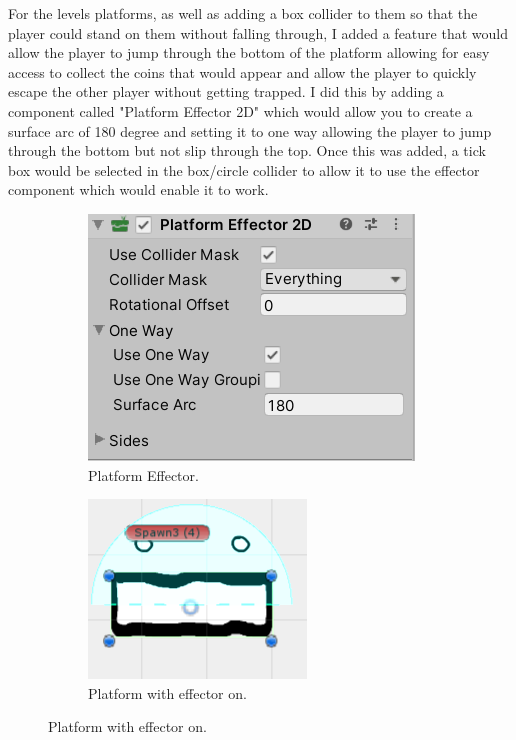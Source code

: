 \newpage

For the levels platforms, as well as adding a box collider to them so that the player could stand on them without falling through, I added a feature that would allow the player to jump through the bottom of the platform allowing for easy access to collect the coins that would appear and allow the player to quickly escape the other player without getting trapped. I did this by adding a component called "Platform Effector 2D" which would allow you to create a surface arc of 180 degree and setting it to one way allowing the player to jump through the bottom but not slip through the top. Once this was added, a tick box would be selected in the box/circle collider to allow it to use the effector component which would enable it to work.

\begin{figure}[h]
\centering
  \begin{subfigure}{.5\textwidth}
\centering
  \includegraphics[width= 0.8\linewidth]{Images/PlatformEffector2D.PNG}
  \caption{Platform Effector.}
  \label{fig:PlatEffect}
  \end{subfigure}%
    \begin{subfigure}{.5\textwidth}
\centering
  \includegraphics[width= 0.8\linewidth]{Images/PlatformWithEffector.PNG}
  \caption{Platform with effector on.}
  \label{fig:PlatEffOn}
  \end{subfigure}%
\end{figure}


